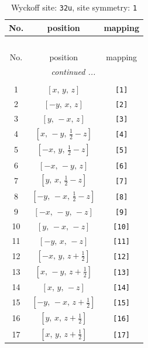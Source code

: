 \documentclass[fleqn,8pt]{jsarticle}
\begin{document}
\renewcommand{\arraystretch}{1.2}
\begin{longtable}{ccc}
\caption{Wyckoff site: {\tt 32u}, site symmetry: {\tt 1}}
 \\
 \hline \hline
No. & position & mapping \\ \hline \endfirsthead

\multicolumn{2}{l}{\tablename\ \thetable{}} \\
 \hline \hline
No. & position & mapping \\ \hline \endhead

 \hline \hline
\multicolumn{2}{r}{\footnotesize\it continued ...} \\ \endfoot

 \hline \hline
\multicolumn{2}{r}{} \\ \endlastfoot

1 & $\left[ x,\, y,\, z \right]$ & {\tt [1]} \\ \hline
2 & $\left[ - y,\, x,\, z \right]$ & {\tt [2]} \\ \hline
3 & $\left[ y,\, - x,\, z \right]$ & {\tt [3]} \\ \hline
4 & $\left[ x,\, - y,\, \frac{1}{2} - z \right]$ & {\tt [4]} \\ \hline
5 & $\left[ - x,\, y,\, \frac{1}{2} - z \right]$ & {\tt [5]} \\ \hline
6 & $\left[ - x,\, - y,\, z \right]$ & {\tt [6]} \\ \hline
7 & $\left[ y,\, x,\, \frac{1}{2} - z \right]$ & {\tt [7]} \\ \hline
8 & $\left[ - y,\, - x,\, \frac{1}{2} - z \right]$ & {\tt [8]} \\ \hline
9 & $\left[ - x,\, - y,\, - z \right]$ & {\tt [9]} \\ \hline
10 & $\left[ y,\, - x,\, - z \right]$ & {\tt [10]} \\ \hline
11 & $\left[ - y,\, x,\, - z \right]$ & {\tt [11]} \\ \hline
12 & $\left[ - x,\, y,\, z + \frac{1}{2} \right]$ & {\tt [12]} \\ \hline
13 & $\left[ x,\, - y,\, z + \frac{1}{2} \right]$ & {\tt [13]} \\ \hline
14 & $\left[ x,\, y,\, - z \right]$ & {\tt [14]} \\ \hline
15 & $\left[ - y,\, - x,\, z + \frac{1}{2} \right]$ & {\tt [15]} \\ \hline
16 & $\left[ y,\, x,\, z + \frac{1}{2} \right]$ & {\tt [16]} \\ \hline
17 & $\left[ x,\, y,\, z + \frac{1}{2} \right]$ & {\tt [17]} \\ \hline

\end{longtable}
\end{document}
